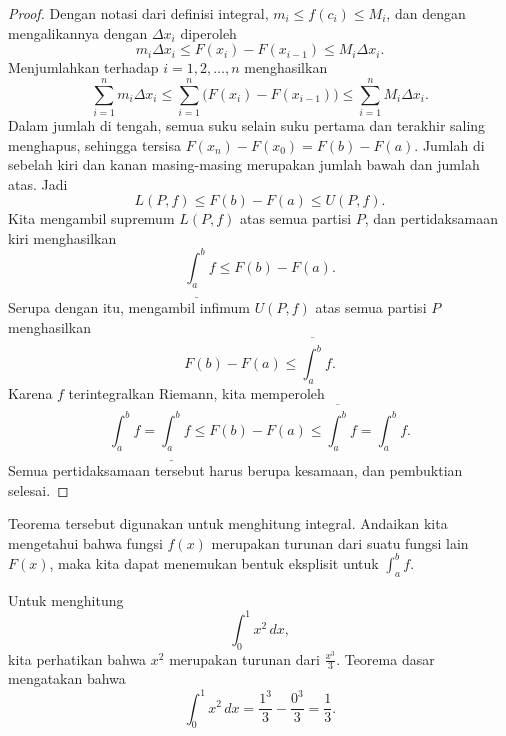 \begin{proof}
Dengan notasi dari definisi integral,
$m_i \leq f(c_i) \leq M_i$, dan dengan mengalikannya dengan $\Delta x_i$ diperoleh
\begin{equation*}
m_i \Delta x_i \leq F(x_i) - F(x_{i-1}) \leq M_i \Delta x_i .
\end{equation*}
Menjumlahkan terhadap $i = 1,2, \ldots, n$ menghasilkan
\begin{equation*}
\sum_{i=1}^n m_i \Delta x_i
\leq \sum_{i=1}^n \bigl(F(x_i) - F(x_{i-1}) \bigr)
\leq \sum_{i=1}^n M_i \Delta x_i .
\end{equation*}
Dalam jumlah di tengah, semua suku selain suku pertama dan terakhir saling menghapus,
sehingga tersisa $F(x_n)-F(x_0) = F(b)-F(a)$.  Jumlah di sebelah kiri
dan kanan masing-masing merupakan jumlah bawah dan jumlah atas.  Jadi
\begin{equation*}
L(P,f) \leq F(b)-F(a) \leq U(P,f) .
\end{equation*}
Kita mengambil supremum $L(P,f)$ atas semua partisi $P$, dan pertidaksamaan kiri
menghasilkan
\begin{equation*}
\underline{\int_a^b} f \leq F(b)-F(a) .
\end{equation*}
Serupa dengan itu, mengambil
infimum $U(P,f)$ atas semua partisi $P$ menghasilkan
\begin{equation*}
F(b)-F(a) \leq \overline{\int_a^b} f .
\end{equation*}
Karena $f$ terintegralkan Riemann, kita memperoleh
\begin{equation*}
\int_a^b f =
\underline{\int_a^b} f \leq F(b)-F(a) \leq \overline{\int_a^b} f
= \int_a^b f .
\end{equation*}
Semua pertidaksamaan tersebut harus berupa kesamaan, dan pembuktian selesai.
\end{proof}

Teorema tersebut digunakan untuk menghitung integral.  Andaikan kita mengetahui bahwa
fungsi $f(x)$ merupakan turunan dari suatu fungsi lain $F(x)$,
maka kita dapat menemukan bentuk eksplisit untuk $\int_a^b f$.

\begin{example}
Untuk menghitung
\begin{equation*}
\int_0^1 x^2 \,dx ,
\end{equation*}
kita perhatikan bahwa $x^2$ merupakan turunan dari $\frac{x^3}{3}$.
Teorema dasar mengatakan bahwa
\begin{equation*}
\int_0^1 x^2 \,dx =
\frac{1^3}{3}
-
\frac{0^3}{3}
= \frac{1}{3}.
\end{equation*}
\end{example}

